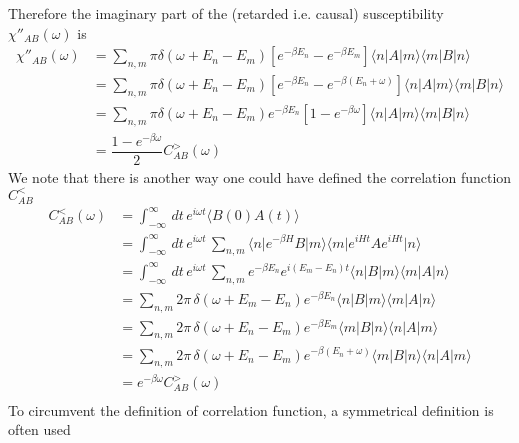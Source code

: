 \documentclass[aps,prb,onecolumn,notitlepage,showpacs,floatfix,superscriptaddress]{revtex4-1}
\newcommand{\cgr}{C^{>}_{AB}}
\newcommand{\clr}{C^{<}_{AB}}
\begin{document}
Therefore the imaginary part of the (retarded i.e. causal) susceptibility $\chi''_{AB} (\omega) $ is
\begin{equation}
\begin{split}
\chi''_{AB} (\omega) &=  \sum_{n,m} \pi \delta(\omega + E_n -E_m ) \left[ e^{-\beta E_n }-e^{-\beta E_m } \right]\langle n \vert  A \vert m \rangle \langle m \vert  B \vert n \rangle \\
&=  \sum_{n,m} \pi \delta(\omega + E_n -E_m ) \left[ e^{-\beta E_n }-e^{-\beta (E_n+\omega) } \right]\langle n \vert  A \vert m \rangle \langle m \vert  B \vert n \rangle \\
&=  \sum_{n,m} \pi \delta(\omega + E_n -E_m ) e^{-\beta E_n } \left[ 1-e^{-\beta \omega } \right]\langle n \vert  A \vert m \rangle \langle m \vert  B \vert n \rangle \\
&= \dfrac{ 1-e^{-\beta \omega }}{2} \cgr (\omega)
\end{split}
\end{equation}
We note that there is another way one could have defined the correlation function $\clr$ 
\begin{equation}
\begin{split}
\clr (\omega) &= \int_{-\infty}^{\infty} \, dt \, e^{i \omega t} \langle  B(0) A(t) \rangle \\
&= \int_{-\infty}^{\infty} \, dt \, e^{i \omega t} \, \sum_{n,m} \langle n \vert  e^{-\beta H} B \vert m \rangle \langle m \vert   e^{i H t} A e^{i H t}  \vert n \rangle \\
&= \int_{-\infty}^{\infty} \, dt \, e^{i \omega t} \, \sum_{n,m} e^{-\beta E_n } e^{i (E_m - E_n) t} \langle n \vert  B \vert m \rangle \langle m \vert  A \vert n \rangle \\
&=  \sum_{n,m} 2 \pi \, \delta(\omega + E_m - E_n) e^{-\beta E_n } \langle n \vert  B \vert m \rangle \langle m \vert  A \vert n \rangle \\
&=  \sum_{n,m} 2 \pi \, \delta(\omega + E_n - E_m) e^{-\beta E_m } \langle m \vert  B \vert n \rangle \langle n \vert  A \vert m \rangle \\
&=  \sum_{n,m} 2 \pi \, \delta(\omega + E_n - E_m) e^{-\beta (E_n+\omega) } \langle m \vert  B \vert n \rangle \langle n \vert  A \vert m \rangle \\
&=  e^{-\beta \omega } \cgr (\omega)\\
\end{split}
\end{equation}
To circumvent the definition of correlation function, a symmetrical definition is often used
\end{document}
